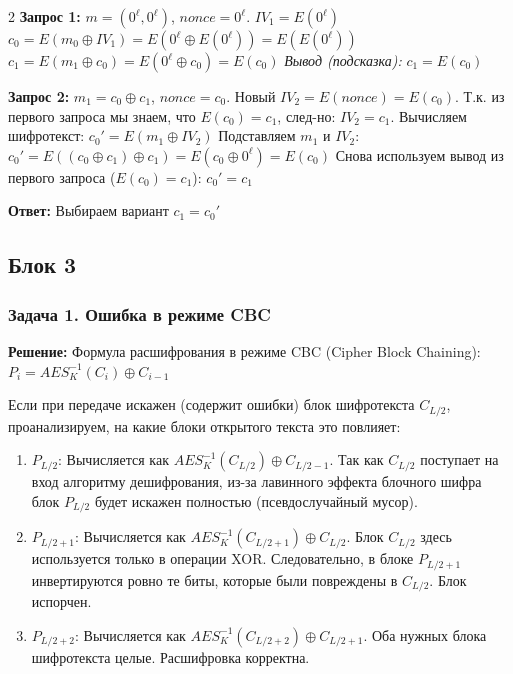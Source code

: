 ﻿\documentclass[10pt,a4paper,landscape]{extarticle}
\newcommand{\tightlist}{}
\begin{document}
\begin{multicols*}{2}
\textbf{Запрос 1:} \(m = (0^\ell, 0^\ell)\), \(nonce = 0^\ell\). \(IV_1 = E(0^\ell)\) \(c_0 = E(m_0 \oplus IV_1) = E(0^\ell \oplus E(0^\ell)) = E(E(0^\ell))\) \(c_1 = E(m_1 \oplus c_0) = E(0^\ell \oplus c_0) = E(c_0)\) \emph{Вывод (подсказка):} \textbf{\(c_1 = E(c_0)\)}

\textbf{Запрос 2:} \(m_1 = c_0 \oplus c_1\), \(nonce = c_0\). Новый \(IV_2 = E(nonce) = E(c_0)\). Т.к. из первого запроса мы знаем, что \(E(c_0) = c_1\), след-но: \textbf{\(IV_2 = c_1\)}. Вычисляем шифротекст: \(c_0' = E(m_1 \oplus IV_2)\) Подставляем \(m_1\) и \(IV_2\): \(c_0' = E((c_0 \oplus c_1) \oplus c_1) = E(c_0 \oplus 0^\ell) = E(c_0)\) Снова используем вывод из первого запроса (\(E(c_0) = c_1\)): \textbf{\(c_0' = c_1\)}

\textbf{Ответ:} Выбираем вариант \textbf{\(c_1 = c_0'\)}

\subsection{Блок 3}\label{ux431ux43bux43eux43a-3}

\subsubsection{Задача 1. Ошибка в режиме CBC}\label{ux437ux430ux434ux430ux447ux430-1.-ux43eux448ux438ux431ux43aux430-ux432-ux440ux435ux436ux438ux43cux435-cbc}

\textbf{Решение:} Формула расшифрования в режиме CBC (Cipher Block Chaining): \(P_i = AES^{-1}_K(C_i) \oplus C_{i-1}\)

Если при передаче искажен (содержит ошибки) блок шифротекста \(C_{L/2}\), проанализируем, на какие блоки открытого текста это повлияет:

\begin{enumerate}
\def\labelenumi{\arabic{enumi}.}
\tightlist
\item
  \textbf{\(P_{L/2}\)}: Вычисляется как \(AES^{-1}_K(C_{L/2}) \oplus C_{L/2 - 1}\). Так как \(C_{L/2}\) поступает на вход алгоритму дешифрования, из-за лавинного эффекта блочного шифра блок \(P_{L/2}\) будет искажен полностью (псевдослучайный мусор).
\item
  \textbf{\(P_{L/2 + 1}\)}: Вычисляется как \(AES^{-1}_K(C_{L/2 + 1}) \oplus C_{L/2}\). Блок \(C_{L/2}\) здесь используется только в операции XOR. Следовательно, в блоке \(P_{L/2 + 1}\) инвертируются ровно те биты, которые были повреждены в \(C_{L/2}\). Блок испорчен.
\item
  \textbf{\(P_{L/2 + 2}\)}: Вычисляется как \(AES^{-1}_K(C_{L/2 + 2}) \oplus C_{L/2 + 1}\). Оба нужных блока шифротекста целые. Расшифровка корректна.
\end{enumerate}


\end{multicols*}
\end{document}
